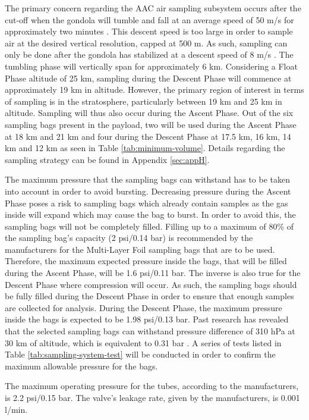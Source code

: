 \documentclass[a4paper,12pt,twoside]{article}
\begin{document}
The primary concern regarding the AAC air sampling subsystem occurs after the cut-off when the gondola will tumble and fall at an average speed of 50 m/s for approximately two minutes \cite{BexusManual}. This descent speed is too large in order to sample air at the desired vertical resolution, capped at 500 m. As such, sampling can only be done after the gondola has stabilized at a descent speed  of 8 m/s \cite{BexusManual}. The tumbling phase will vertically span for approximately 6 km. Considering a Float Phase altitude of 25 km, sampling during the Descent Phase will commence at approximately 19 km in altitude. However, the primary region of interest in terms of sampling is in the stratosphere, particularly between 19 km and 25 km in altitude. Sampling will thus also occur during the Ascent Phase. Out of the six sampling bags present in the payload, two will be used during the Ascent Phase at 18 km and 21 km and four during the Descent Phase at 17.5 km, 16 km, 14 km and 12 km as seen in Table \ref{tab:minimum-volume}. Details regarding the sampling strategy can be found in Appendix \ref{sec:appH}.

%
The maximum pressure that the sampling bags can withstand has to be taken into account in order to avoid bursting. Decreasing pressure during the Ascent Phase poses a risk to sampling bags which already contain samples as the gas inside will expand which may cause the bag to burst. In order to avoid this, the sampling bags will not be completely filled. Filling up to a maximum of 80\% of the sampling bag's capacity (2 psi/0.14 bar) is recommended by the manufacturers for the Multi-Layer Foil sampling bags that are to be used. Therefore, the maximum expected pressure inside the bags, that will be filled during the Ascent Phase, will be 1.6 psi/0.11 bar. The inverse is also true for the Descent Phase where compression will occur. As such, the sampling bags should be fully filled during the Descent Phase in order to ensure that enough samples are collected for analysis. During the Descent Phase, the maximum pressure inside the bags is expected to be 1.98 psi/0.13 bar. Past research has revealed that the selected sampling bags can withstand pressure difference of 310 hPa at 30 km of altitude, which is equivalent to 0.31 bar \cite{LISA}. A series of tests listed in Table \ref{tab:sampling-system-test} will be conducted in order to confirm the maximum allowable pressure for the bags.

The maximum operating pressure for the tubes, according to the manufacturers, is 2.2 psi/0.15 bar. The valve's leakage rate, given by the manufacturers, is 0.001 l/min.     
\end{document}
